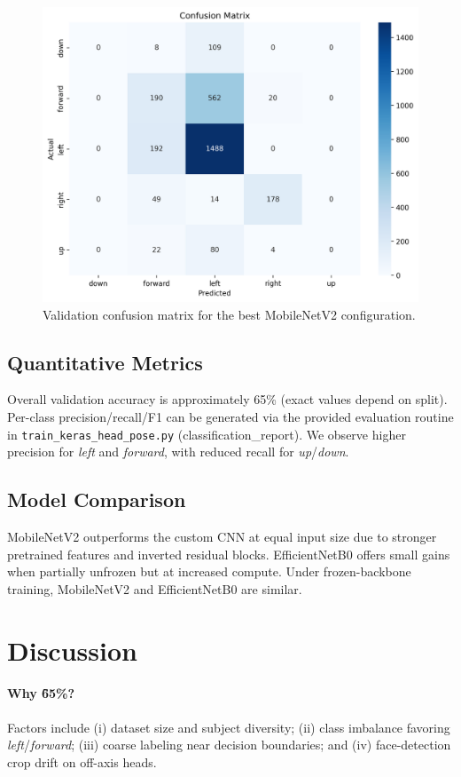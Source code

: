 \documentclass[11pt]{article}
\begin{document}
\begin{figure}[h]
  \centering
  \includegraphics[width=0.85\linewidth]{confusion_matrix.png}
  \caption{Validation confusion matrix for the best MobileNetV2 configuration.}
  \label{fig:cm}
\end{figure}

\subsection{Quantitative Metrics}
Overall validation accuracy is approximately 65\% (exact values depend on split). Per-class precision/recall/F1 can be generated via the provided evaluation routine in \texttt{train\_keras\_head\_pose.py} (classification\_report). We observe higher precision for \emph{left} and \emph{forward}, with reduced recall for \emph{up}/\emph{down}.

\subsection{Model Comparison}
MobileNetV2 outperforms the custom CNN at equal input size due to stronger pretrained features and inverted residual blocks. EfficientNetB0 offers small gains when partially unfrozen but at increased compute. Under frozen-backbone training, MobileNetV2 and EfficientNetB0 are similar.

\section{Discussion}
\paragraph{Why \~65\%?} Factors include (i) dataset size and subject diversity; (ii) class imbalance favoring \emph{left}/\emph{forward}; (iii) coarse labeling near decision boundaries; and (iv) face-detection crop drift on off-axis heads.
\end{document}
